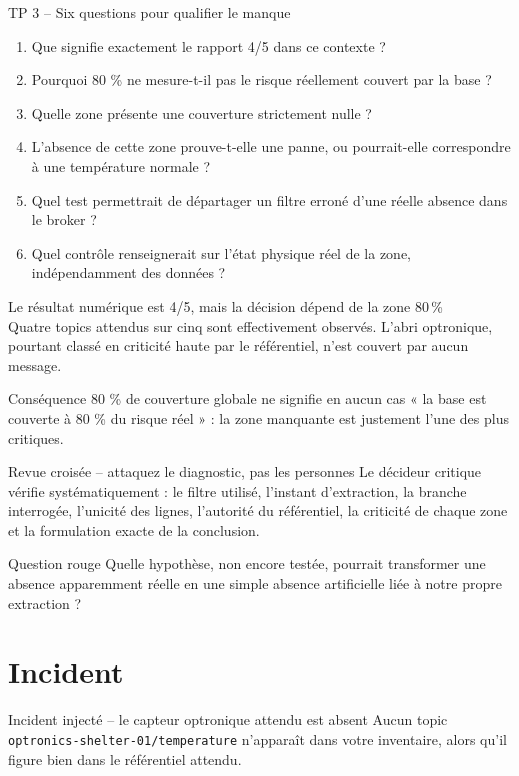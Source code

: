 \documentclass[aspectratio=169]{beamer}
\begin{document}
\begin{frame}{TP 3 -- Six questions pour qualifier le manque}
\small
\begin{enumerate}
\item Que signifie exactement le rapport 4/5 dans ce contexte ?
\item Pourquoi 80 \% ne mesure-t-il pas le risque réellement couvert par la base ?
\item Quelle zone présente une couverture strictement nulle ?
\item L'absence de cette zone prouve-t-elle une panne, ou pourrait-elle correspondre à une température normale ?
\item Quel test permettrait de départager un filtre erroné d'une réelle absence dans le broker ?
\item Quel contrôle renseignerait sur l'état physique réel de la zone, indépendamment des données ?
\end{enumerate}
\end{frame}

\begin{frame}{Le résultat numérique est 4/5, mais la décision dépend de la zone}
\centering\Huge 80\,\%\\[.5em]
\normalsize Quatre topics attendus sur cinq sont effectivement observés. L'abri optronique, pourtant classé en criticité haute par le référentiel, n'est couvert par aucun message.
\begin{alertblock}{Conséquence}
80 \% de couverture globale ne signifie en aucun cas « la base est couverte à 80 \% du risque réel » : la zone manquante est justement l'une des plus critiques.
\end{alertblock}
\end{frame}

\begin{frame}{Revue croisée -- attaquez le diagnostic, pas les personnes}
Le décideur critique vérifie systématiquement : le filtre utilisé, l'instant d'extraction, la branche interrogée, l'unicité des lignes, l'autorité du référentiel, la criticité de chaque zone et la formulation exacte de la conclusion.
\begin{block}{Question rouge}
Quelle hypothèse, non encore testée, pourrait transformer une absence apparemment réelle en une simple absence artificielle liée à notre propre extraction ?
\end{block}
\end{frame}

\section{Incident}
\begin{frame}{Incident injecté -- le capteur optronique attendu est absent}
\large Aucun topic \texttt{optronics-shelter-01/temperature} n'apparaît dans votre inventaire, alors qu'il figure bien dans le référentiel attendu.
\end{frame}
\end{document}
